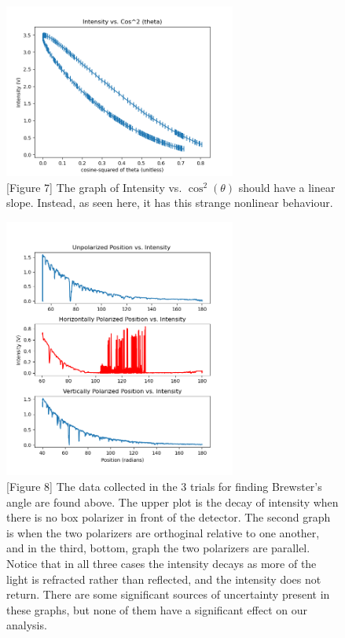 \documentclass[11pt]{article}
\begin{document}
\begin{multicols}{2}
    \begin{figure}[H]
        \hspace{-5pt}
        \includegraphics[width=3in]{cos_square_theta.png}
        \caption*{[Figure 7] The graph of Intensity vs. $\cos^2(\theta)$ should have a linear slope. Instead, as seen here, it has this strange nonlinear behaviour. }
        \label{fig:malus_3}
    \end{figure}

    \begin{figure}[H]
        \hspace{-5pt}
        \includegraphics[width=3in]{brewster_data.png}
        \caption*{[Figure 8] The data collected in the 3 trials for finding Brewster's angle are found above. The upper plot is the decay of intensity when there is no box polarizer in front of the detector. The second graph is when the two polarizers are orthoginal relative to one another, and in the third, bottom, graph the two polarizers are parallel. Notice that in all three cases the intensity decays as more of the light is refracted rather than reflected, and the intensity does not return. There are some significant sources of uncertainty present in these graphs, but none of them have a significant effect on our analysis. }
        \label{fig:malus_3}
    \end{figure}

\end{multicols}
\end{document}
